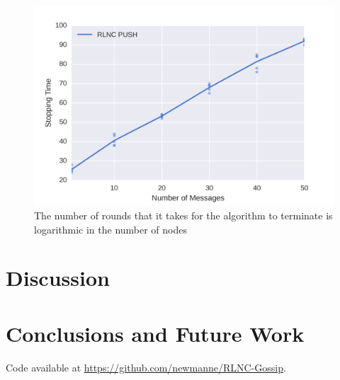 \documentclass{article} %
\begin{document}
\begin{figure}
\centering
\includegraphics[width=\linewidth]{figures/rlnc-vary-n.png}
\caption{The number of rounds that it takes for the algorithm to terminate is logarithmic in the number of nodes}
\label{fig:rlnc-vary-n}
\end{figure} 

\section{Discussion}

\section{Conclusions and Future Work}
Code available at \url{https://github.com/newmanne/RLNC-Gossip}.

\nocite{*}


\end{document}
